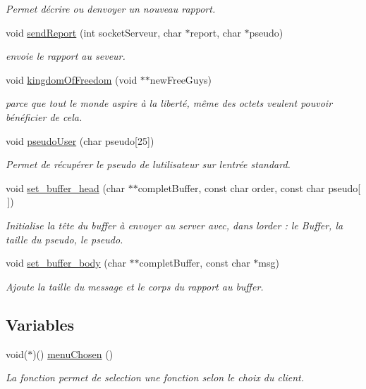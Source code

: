\begin{DoxyCompactItemize}
\begin{DoxyCompactList}\small\item\em Permet d\textquotesingle{}écrire ou d\textquotesingle{}envoyer un nouveau rapport. \end{DoxyCompactList}\item 
void \hyperlink{group__main_ga7d6a98e7522d16b636002acaed73e98e}{send\+Report} (int socket\+Serveur, char $\ast$report, char $\ast$pseudo)
\begin{DoxyCompactList}\small\item\em envoie le rapport au seveur. \end{DoxyCompactList}\item 
void \hyperlink{group__main_gac0e6b092ca870499ed8aa48295046527}{kingdom\+Of\+Freedom} (void $\ast$$\ast$new\+Free\+Guys)
\begin{DoxyCompactList}\small\item\em parce que tout le monde aspire à la liberté, même des octets veulent pouvoir bénéficier de cela. \end{DoxyCompactList}\item 
void \hyperlink{group__main_gaddc404e3b046aad347a092251d8ad25c}{pseudo\+User} (char pseudo\mbox{[}25\mbox{]})
\begin{DoxyCompactList}\small\item\em Permet de récupérer le pseudo de l\textquotesingle{}utilisateur sur l\textquotesingle{}entrée standard. \end{DoxyCompactList}\item 
void \hyperlink{group__main_ga21d1bed03ebb416b623232da3a709eaa}{set\+\_\+buffer\+\_\+head} (char $\ast$$\ast$complet\+Buffer, const char order, const char pseudo\mbox{[}$\,$\mbox{]})
\begin{DoxyCompactList}\small\item\em Initialise la tête du buffer à envoyer au server avec, dans l\textquotesingle{}order \+: le Buffer, la taille du pseudo, le pseudo. \end{DoxyCompactList}\item 
void \hyperlink{group__main_ga52a26b6e09ccf335eb8dffb7909684b2}{set\+\_\+buffer\+\_\+body} (char $\ast$$\ast$complet\+Buffer, const char $\ast$msg)
\begin{DoxyCompactList}\small\item\em Ajoute la taille du message et le corps du rapport au buffer. \end{DoxyCompactList}\end{DoxyCompactItemize}
\subsection*{Variables}
\begin{DoxyCompactItemize}
\item 
void($\ast$)() \hyperlink{group__main_ga8ec19ec9491838d0c0d5ebca1e4a930c}{menu\+Chosen} ()
\begin{DoxyCompactList}\small\item\em La fonction permet de selection une fonction selon le choix du client. \end{DoxyCompactList}\end{DoxyCompactItemize}



